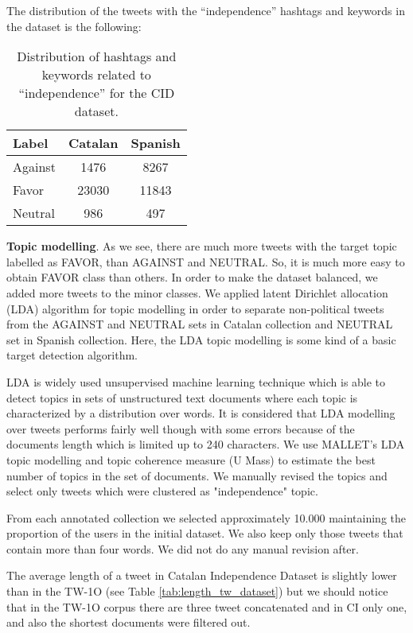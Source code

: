 \documentclass[10pt, a4paper]{article}
\begin{document}
The distribution of the tweets with the ``independence'' hashtags and keywords in the dataset is the following:

\begin{table}[!ht]
\centering
\begin{tabular}{lcc} \hline
Label & Catalan & Spanish\\ \hline
 Against & 1476 & 8267 \\
Favor & 23030 & 11843 \\
Neutral & 986 & 497 \\ \hline
\end{tabular}
\caption{Distribution of hashtags and keywords related to ``independence'' for the CID dataset.}
\end{table}

\textbf{Topic modelling}. As we see, there are much more tweets with the target topic labelled as FAVOR, than AGAINST and NEUTRAL. So, it is much more easy to obtain FAVOR class than others. In order to make the dataset balanced, we added more tweets to the minor classes. We applied latent Dirichlet allocation (LDA) algorithm \cite{Blei:2003:LDA:944919.944937} for topic modelling in order to separate non-political tweets from the AGAINST and NEUTRAL sets in Catalan collection and NEUTRAL set in Spanish collection. Here, the LDA topic modelling is some kind of a basic target detection algorithm.

LDA is widely used unsupervised machine learning technique which is able to detect topics in sets of unstructured text documents where each topic is characterized by a distribution over words. It is considered that LDA modelling over tweets performs fairly well though with some errors because of the documents length which is limited up to 240 characters. We use MALLET's LDA \cite{McCallumMALLET} topic modelling and topic coherence measure (U Mass) to estimate the best number of topics in the set of documents. We manually revised the topics and select only tweets which were clustered  as "independence" topic.

From each annotated collection we selected approximately 10.000 maintaining the proportion of the users in the initial dataset. We also keep only those tweets that contain more than four words. We did not do any manual revision after.

The average length of a tweet in Catalan Independence Dataset is slightly lower than in the TW-1O (see Table \ref{tab:length_tw_dataset}) but we should notice that in the TW-1O corpus there are three tweet concatenated and in CI only one, and also the shortest documents were filtered out.
\end{document}
